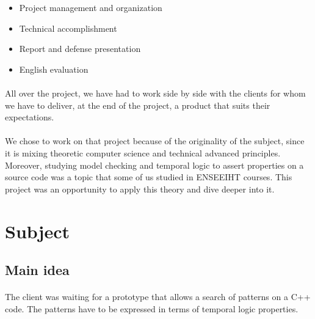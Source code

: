 \documentclass{report}
\begin{document}
\vspace{1.5mm}
\begin{itemize}
\item Project management and organization\vspace{1mm}
\item Technical accomplishment\vspace{1mm}
\item Report and defense presentation\vspace{1mm}
\item English evaluation\vspace{1mm}
\end{itemize}

\paragraph{}
\hspace{4mm}All over the project, we have had to work side by side with the clients 
for whom we have to deliver, at the end of the project, a product
 that suits their expectations.

\paragraph{}
\hspace{4mm}We chose to work on that project because of the originality of 
the subject, since it is mixing theoretic computer science and 
technical advanced principles. Moreover, studying model checking 
and temporal logic to assert properties on a source code was a topic that some of us studied in ENSEEIHT courses. 
This project was an opportunity to apply this theory and dive deeper into it.

\section{Subject}

\subsection{Main idea}

\paragraph{}
\hspace{4mm}The client was waiting for a prototype that allows a search of patterns on a C++ code. The patterns have to be expressed in terms of temporal logic properties.
\end{document}
